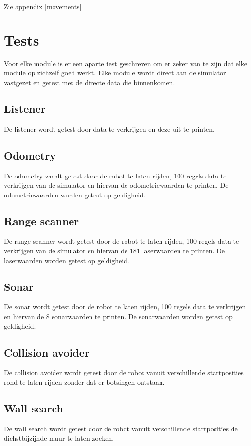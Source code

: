 \documentclass[a4paper,10pt]{article}
\begin{document}
Zie appendix \ref{movements}

\section{Tests}
Voor elke module is er een aparte test geschreven om er zeker van te zijn dat elke module op zichzelf goed werkt. Elke module wordt direct aan de simulator vastgezet en getest met de directe data die binnenkomen. 

\subsection{Listener}
De listener wordt getest door data te verkrijgen en deze uit te printen.

\subsection{Odometry}
De odometry wordt getest door de robot te laten rijden, 100 regels data te verkrijgen van de simulator en hiervan de odometriewaarden te printen. De odometriewaarden worden getest op geldigheid.

\subsection{Range scanner}
De range scanner wordt getest door de robot te laten rijden, 100 regels data te verkrijgen van de simulator en hiervan de 181 laserwaarden te printen. De laserwaarden worden getest op geldigheid.

\subsection{Sonar}
De sonar wordt getest door de robot te laten rijden, 100 regels data te verkrijgen en hiervan de 8 sonarwaarden te printen. De sonarwaarden worden getest op geldigheid.

\subsection{Collision avoider}
De collision avoider wordt getest door de robot vanuit verschillende startposities rond te laten rijden zonder dat er botsingen ontstaan.

\subsection{Wall search}
De wall search wordt getest door de robot vanuit verschillende startposities de dichstbijzijnde muur te laten zoeken. 
\end{document}
